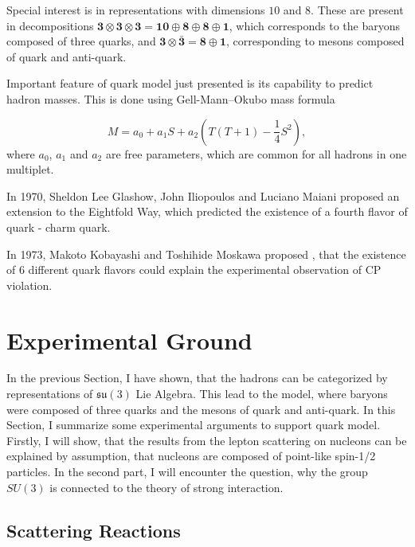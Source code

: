 Special interest is in representations with dimensions $10$ and $8$. These
are present in decompositions $\mathbf{3} \otimes \mathbf{3} \otimes
\mathbf{3} = \mathbf{10} \oplus \mathbf{8} \oplus \mathbf{8} \oplus \mathbf{1}$,
which corresponds to the baryons composed of three quarks, and $\mathbf{3}
\otimes \bar{\mathbf{3}} = \mathbf{8} \oplus \mathbf{1}$, corresponding to
mesons composed of quark and anti-quark.

Important feature of quark model just presented is its capability to predict
hadron masses. This is done using Gell-Mann--Okubo mass formula
\cite{Gell-Mann:1250016,Okubo01051962}

\begin{equation}
  M = a_0 + a_1 S + a_2 \left( T(T+1) - \frac{1}{4}S^2 \right),
  \label{eq:GellMannOkubo}
\end{equation}
where $a_0$, $a_1$ and $a_2$ are free parameters, which are common for all
hadrons in one multiplet. 

In 1970, Sheldon Lee Glashow, John Iliopoulos and Luciano Maiani proposed
\cite{Quarks4} an extension to the Eightfold Way, which predicted the existence of
a fourth flavor of quark - charm quark. 

In 1973, Makoto Kobayashi and Toshihide Moskawa proposed \cite{Quarks6}, that the
existence of 6 different quark flavors could explain the experimental
observation of CP violation.


\section{Experimental Ground}

In the previous Section, I have shown, that the hadrons can be categorized by
representations of $\mathfrak{su}(3)$ Lie Algebra. 
This lead to the model, where baryons were composed of three quarks and the
mesons of quark and anti-quark. 
In this Section, I summarize some experimental arguments to
support quark model.
Firstly, I will show, that the results from the lepton
scattering on nucleons can be explained by assumption, that nucleons are
composed of point-like spin-1/2 particles.
In the second part, I will encounter the question, why the group $SU(3)$ is
connected to the theory of strong interaction. 

\subsection{Scattering Reactions}

